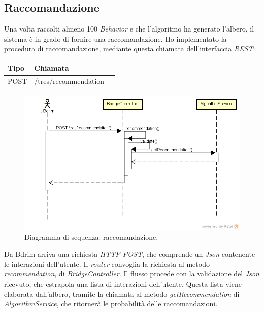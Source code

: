 \subsection{Raccomandazione}
Una volta raccolti almeno 100 \emph{Behavior} e che l'algoritmo ha generato l'albero, il sistema è in grado di fornire una raccomandazione. Ho implementato la procedura di raccomandazione, mediante questa chiamata dell'interfaccia \emph{REST}:
\def\arraystretch{1.5}
\begin{longtable}{|p{2.5cm}|p{5cm}|l|}
\hline
\textbf{Tipo} &	\textbf{Chiamata}	\\\hline
POST	&	/tres/recommendation	 \\\hline
\end{longtable}
\begin{figure}[h]
\centering
\includegraphics[scale=0.42]{immagini/DSracommandazione}
\caption{Diagramma di sequenza: raccomandazione.}
\label{fig:get-recommendation}
\end{figure}
Da Bdrim arriva una richiesta \emph{HTTP POST}, che comprende un \emph{Json} contenente le interazioni dell'utente. Il \emph{router} convoglia la richiesta al metodo \emph{recommendation}, di \emph{BridgeController}. Il flusso procede con la validazione del \emph{Json} ricevuto, che estrapola una lista di interazioni dell'utente. Questa lista viene elaborata dall'albero, tramite la chiamata al metodo \emph{getRecommendation} di \emph{AlgorithmService}, che ritornerà le probabilità delle raccomandazioni. 




\newpage
